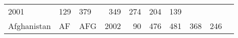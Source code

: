 \documentclass[]{article}
\begin{document}
\begin{longtable}[]{@{}lllrrrrrrr@{}}
\begin{minipage}[t]{0.04\columnwidth}
2001\strut
\end{minipage} & \begin{minipage}[t]{0.08\columnwidth}\raggedleft\strut
129\strut
\end{minipage} & \begin{minipage}[t]{0.09\columnwidth}\raggedleft\strut
379\strut
\end{minipage} & \begin{minipage}[t]{0.09\columnwidth}\raggedleft\strut
349\strut
\end{minipage} & \begin{minipage}[t]{0.09\columnwidth}\raggedleft\strut
274\strut
\end{minipage} & \begin{minipage}[t]{0.09\columnwidth}\raggedleft\strut
204\strut
\end{minipage} & \begin{minipage}[t]{0.09\columnwidth}\raggedleft\strut
139\strut
\end{minipage}\tabularnewline
\begin{minipage}[t]{0.08\columnwidth}\raggedright\strut
Afghanistan\strut
\end{minipage} & \begin{minipage}[t]{0.04\columnwidth}\raggedright\strut
AF\strut
\end{minipage} & \begin{minipage}[t]{0.04\columnwidth}\raggedright\strut
AFG\strut
\end{minipage} & \begin{minipage}[t]{0.04\columnwidth}\raggedleft\strut
2002\strut
\end{minipage} & \begin{minipage}[t]{0.08\columnwidth}\raggedleft\strut
90\strut
\end{minipage} & \begin{minipage}[t]{0.09\columnwidth}\raggedleft\strut
476\strut
\end{minipage} & \begin{minipage}[t]{0.09\columnwidth}\raggedleft\strut
481\strut
\end{minipage} & \begin{minipage}[t]{0.09\columnwidth}\raggedleft\strut
368\strut
\end{minipage} & \begin{minipage}[t]{0.09\columnwidth}\raggedleft\strut
246\strut
\end{minipage} & \begin{minipage}[t]{0.09\columnwidth}\raggedleft\strut

\end{minipage}
\end{longtable}
\end{document}
